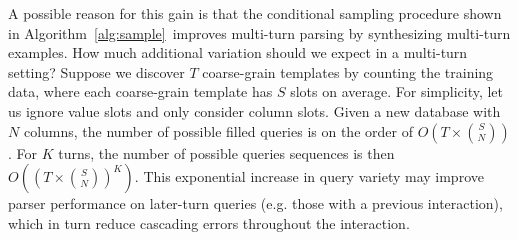 \documentclass[11pt,a4paper]{article}
\begin{document}
A possible reason for this gain is that the conditional sampling procedure shown in Algorithm~\ref{alg:sample}~improves multi-turn parsing by synthesizing multi-turn examples.
How much additional variation should we expect in a multi-turn setting?
Suppose we discover $T$ coarse-grain templates by counting the training data, where each coarse-grain template has $S$ slots on average.
For simplicity, let us ignore value slots and only consider column slots.
Given a new database with $N$ columns, the number of possible filled queries is on the order of $O\left(T \times \binom SN\right)$.
For $K$ turns, the number of possible queries sequences is then $O\left(\left(T \times \binom SN\right)^K\right)$.
This exponential increase in query variety may improve parser performance on later-turn queries (e.g. those with a previous interaction), which in turn reduce cascading errors throughout the interaction.
\end{document}
